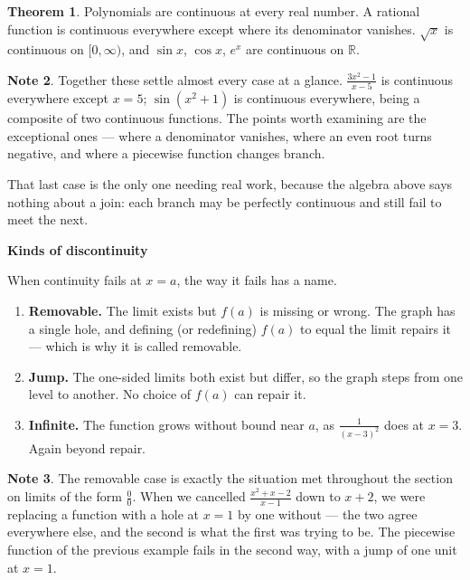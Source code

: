 \documentclass[11pt,a4paper]{article}
\theoremstyle{definition}
\newtheorem{thm}{Theorem}[section]
\newtheorem{note}[thm]{Note}
\begin{document}
\begin{thm}
Polynomials are continuous at every real number. A rational function is continuous
everywhere except where its denominator vanishes. $\sqrt{x}$ is continuous on
$[0,\infty)$, and $\sin x$, $\cos x$, $e^{x}$ are continuous on $\mathbb{R}$.
\end{thm}

\begin{note}
Together these settle almost every case at a glance. $\frac{3x^{2}-1}{x-5}$ is
continuous everywhere except $x=5$; $\sin\left(x^{2}+1\right)$ is continuous
everywhere, being a composite of two continuous functions. The points worth
examining are the exceptional ones --- where a denominator vanishes, where an even
root turns negative, and where a piecewise function changes branch.

That last case is the only one needing real work, because the algebra above says
nothing about a join: each branch may be perfectly continuous and still fail to
meet the next.
\end{note}

\begin{center}
\textbf{Kinds of discontinuity}
\end{center}

When continuity fails at $x=a$, the way it fails has a name.

\begin{enumerate}
\item[(i).] \textbf{Removable.} The limit exists but $f(a)$ is missing or wrong.
The graph has a single hole, and defining (or redefining) $f(a)$ to equal the
limit repairs it --- which is why it is called removable.
\item[(ii).] \textbf{Jump.} The one-sided limits both exist but differ, so the
graph steps from one level to another. No choice of $f(a)$ can repair it.
\item[(iii).] \textbf{Infinite.} The function grows without bound near $a$, as
$\frac{1}{(x-3)^{2}}$ does at $x=3$. Again beyond repair.
\end{enumerate}

\begin{note}
The removable case is exactly the situation met throughout the section on limits of
the form $\frac{0}{0}$. When we cancelled $\frac{x^{2}+x-2}{x-1}$ down to $x+2$, we
were replacing a function with a hole at $x=1$ by one without --- the two agree
everywhere else, and the second is what the first was trying to be. The
piecewise function of the previous example fails in the second way, with a jump of
one unit at $x=1$.
\end{note}
\end{document}
